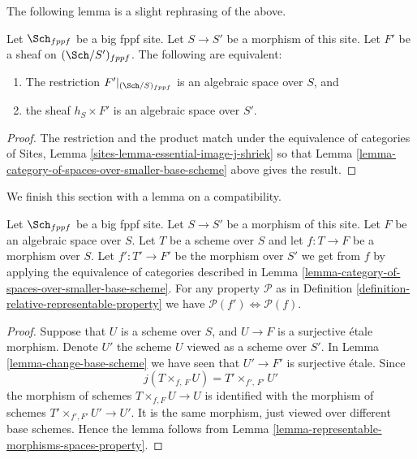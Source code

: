\noindent
The following lemma is a slight rephrasing of the above.

\begin{lemma}
\label{lemma-rephrase}
Let $\Sch_{fppf}$ be a big fppf site.
Let $S \to S'$ be a morphism of this site.
Let $F'$ be a sheaf on $(\Sch/S')_{fppf}$.
The following are equivalent:
\begin{enumerate}
\item The restriction $F'|_{(\Sch/S)_{fppf}}$
is an algebraic space over $S$, and
\item the sheaf $h_S \times F'$ is an algebraic space over $S'$.
\end{enumerate}
\end{lemma}

\begin{proof}
The restriction and the product match under
the equivalence of categories of
Sites, Lemma \ref{sites-lemma-essential-image-j-shriek}
so that
Lemma \ref{lemma-category-of-spaces-over-smaller-base-scheme}
above gives the result.
\end{proof}

\noindent
We finish this section with a lemma on a compatibility.

\begin{lemma}
\label{lemma-viewed-as-properties}
Let $\Sch_{fppf}$ be a big fppf site.
Let $S \to S'$ be a morphism of this site.
Let $F$ be an algebraic space over $S$.
Let $T$ be a scheme over $S$ and let $f : T \to F$ be
a morphism over $S$.
Let $f' : T' \to F'$ be the morphism over $S'$ we get from
$f$ by applying the equivalence of categories described in
Lemma \ref{lemma-category-of-spaces-over-smaller-base-scheme}.
For any property $\mathcal{P}$ as in
Definition \ref{definition-relative-representable-property}
we have $\mathcal{P}(f') \Leftrightarrow \mathcal{P}(f)$.
\end{lemma}

\begin{proof}
Suppose that $U$ is a scheme over $S$, and $U \to F$ is a surjective \'etale
morphism. Denote $U'$ the scheme $U$ viewed as a scheme over $S'$. In
Lemma \ref{lemma-change-base-scheme}
we have seen that $U' \to F'$ is surjective \'etale. Since
$$
j(T \times_{f, \, F} U) = T' \times_{f', \, F'} U'
$$
the morphism of schemes $T \times_{f, F} U \to U$
is identified with the morphism of schemes
$T' \times_{f', F'} U' \to U'$.
It is the same morphism, just viewed over different base schemes.
Hence the lemma follows from
Lemma \ref{lemma-representable-morphisms-spaces-property}.
\end{proof}
















